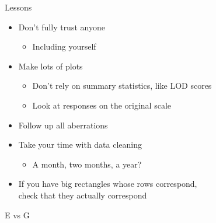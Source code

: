 \documentclass[12pt,t]{beamer}
\begin{document}
\begin{frame}[c]{Lessons}

\small

\begin{itemize}
\itemsep8pt

\item Don't fully trust anyone
\begin{itemize}
\item Including yourself
\end{itemize}

\item Make lots of plots
\begin{itemize}
\item Don't rely on summary statistics, like LOD scores
\item Look at responses on the original scale
\end{itemize}

\item Follow up all aberrations

\item Take your time with data cleaning
\begin{itemize}
\item A month, two months, a year?
\end{itemize}

\item If you have big rectangles whose rows correspond, \\
  check that they {\hilit actually} correspond

\end{itemize}
\note{}
\end{frame}


\begin{frame}[c]{E vs G}



\note{}
\end{frame}
\end{document}
